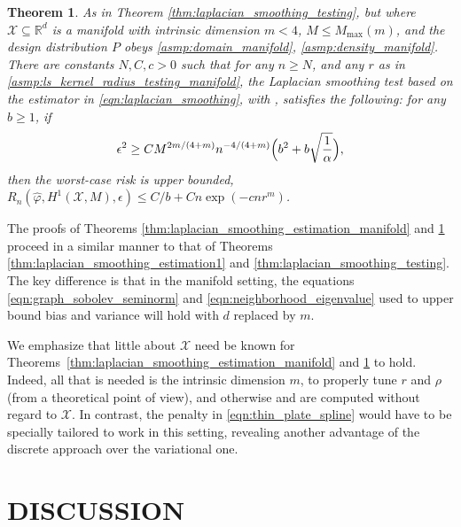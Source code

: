 \documentclass[twoside]{article}
\newcommand{\Reals}{\mathbb{R}}
\newcommand{\1}{\mathbf{1}}
\newcommand{\Rd}{\Reals^d}
\newcommand{\Xset}{\mathcal{X}}
\newcommand{\mc}[1]{\mathcal{#1}}
\newcommand{\wh}[1]{\widehat{#1}}
\newtheorem{theorem}{Theorem}
\theoremstyle{definition}
\theoremstyle{remark}
\begin{document}
\begin{theorem}
	\label{thm:laplacian_smoothing_testing_manifold}
	As in Theorem \ref{thm:laplacian_smoothing_testing}, but where $\Xset \subseteq \Rd$ is a manifold with intrinsic dimension $m < 4$, $M \leq M_{\max}(m)$, and the design distribution $P$ obeys \ref{asmp:domain_manifold}, \ref{asmp:density_manifold}.
	There are constants $N,C,c>0$ such that for any $n \geq N$, and any $r$ as in \ref{asmp:ls_kernel_radius_testing_manifold}, the Laplacian smoothing test \smash{$\wh{\varphi}$} based on the estimator \smash{$\wh{f}$} in \eqref{eqn:laplacian_smoothing}, with , satisfies the following: for any $b \geq 1$, if
	\begin{equation}
	\label{eqn:laplacian_smoothing_testing_manifold}
	\epsilon^2 \geq C M^{2m/(4 + m)} n^{-4/(4 + m)}\Bigl(b^2 + b\sqrt{\frac{1}{\alpha}}\Bigr) ,
	\end{equation} 
	then the worst-case risk is upper bounded, $R_n(\wh{\varphi},H^1(\mc{X},M), \epsilon) \leq C/b + Cn\exp(-cnr^m)$.
\end{theorem}

The proofs of Theorems \ref{thm:laplacian_smoothing_estimation_manifold} and \ref{thm:laplacian_smoothing_testing_manifold} proceed in a similar manner to that of Theorems \ref{thm:laplacian_smoothing_estimation1} and \ref{thm:laplacian_smoothing_testing}. The key difference is that in the manifold setting, the equations \eqref{eqn:graph_sobolev_seminorm} and \eqref{eqn:neighborhood_eigenvalue} used to upper bound bias and variance will hold with $d$ replaced by $m$.

We emphasize that little about $\Xset$ need be known for Theorems~\ref{thm:laplacian_smoothing_estimation_manifold} and \ref{thm:laplacian_smoothing_testing_manifold} to hold. Indeed, all that is needed is the intrinsic dimension $m$, to properly tune $r$ and $\rho$ (from a theoretical point of view), and otherwise \smash{$\wh{f}$} and \smash{$\wh{\varphi}$} are computed without regard to $\Xset$. In contrast, the penalty in \eqref{eqn:thin_plate_spline} would have to be specially tailored to work in this setting, revealing another advantage of the discrete approach over the variational one.

\section{DISCUSSION}
\label{sec:discussion}
\end{document}
